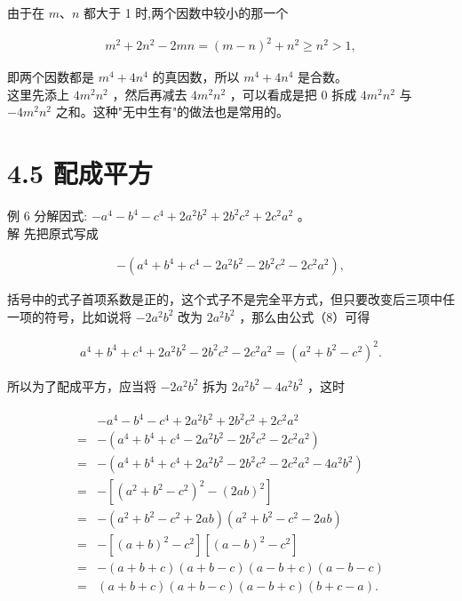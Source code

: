\documentclass[10pt]{article}
\begin{document}
由于在 $m 、 n$ 都大于 1 时,两个因数中较小的那一个

\begin{align*}
m^{2}+2 n^{2}-2 m n=(m-n)^{2}+n^{2} \geqslant n^{2}>1,
\end{align*}

即两个因数都是 $m^{4}+4 n^{4}$ 的真因数，所以 $m^{4}+4 n^{4}$ 是合数。\\
这里先添上 $4 m^{2} n^{2}$ ，然后再减去 $4 m^{2} n^{2}$ ，可以看成是把 0 拆成 $4 m^{2} n^{2}$ 与 $-4 m^{2} n^{2}$ 之和。这种"无中生有"的做法也是常用的。

\section*{4.5 配成平方}
例 6 分解因式: $-a^{4}-b^{4}-c^{4}+2 a^{2} b^{2}+2 b^{2} c^{2}+2 c^{2} a^{2}$ 。\\
解 先把原式写成

\begin{align*}
-\left(a^{4}+b^{4}+c^{4}-2 a^{2} b^{2}-2 b^{2} c^{2}-2 c^{2} a^{2}\right),
\end{align*}

括号中的式子首项系数是正的，这个式子不是完全平方式，但只要改变后三项中任一项的符号，比如说将 $-2 a^{2} b^{2}$ 改为 $2 a^{2} b^{2}$ ，那么由公式（8）可得

\begin{align*}
a^{4}+b^{4}+c^{4}+2 a^{2} b^{2}-2 b^{2} c^{2}-2 c^{2} a^{2}=\left(a^{2}+b^{2}-c^{2}\right)^{2} .
\end{align*}

所以为了配成平方，应当将 $-2 a^{2} b^{2}$ 拆为 $2 a^{2} b^{2}-4 a^{2} b^{2}$ ，这时

\begin{align*}
\begin{aligned}
& -a^{4}-b^{4}-c^{4}+2 a^{2} b^{2}+2 b^{2} c^{2}+2 c^{2} a^{2} \\
= & -\left(a^{4}+b^{4}+c^{4}-2 a^{2} b^{2}-2 b^{2} c^{2}-2 c^{2} a^{2}\right) \\
= & -\left(a^{4}+b^{4}+c^{4}+2 a^{2} b^{2}-2 b^{2} c^{2}-2 c^{2} a^{2}-4 a^{2} b^{2}\right) \\
= & -\left[\left(a^{2}+b^{2}-c^{2}\right)^{2}-(2 a b)^{2}\right] \\
= & -\left(a^{2}+b^{2}-c^{2}+2 a b\right)\left(a^{2}+b^{2}-c^{2}-2 a b\right) \\
= & -\left[(a+b)^{2}-c^{2}\right]\left[(a-b)^{2}-c^{2}\right] \\
= & -(a+b+c)(a+b-c)(a-b+c)(a-b-c) \\
= & (a+b+c)(a+b-c)(a-b+c)(b+c-a) .
\end{aligned}
\end{align*}
\end{document}
